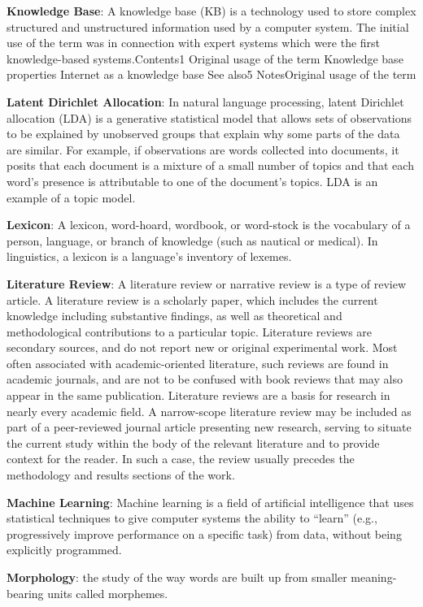 \documentclass[b5paper,]{book}
\theoremstyle{definition}
\theoremstyle{definition}
\theoremstyle{definition}
\theoremstyle{remark}
\begin{document}
\textbf{Knowledge Base}: A knowledge base (KB) is a technology used to
store complex structured and unstructured information used by a computer
system. The initial use of the term was in connection with expert
systems which were the first knowledge-based systems.Contents1 Original
usage of the term Knowledge base properties Internet as a knowledge base
See also5 NotesOriginal usage of the term

\textbf{Latent Dirichlet Allocation}: In natural language processing,
latent Dirichlet allocation (LDA) is a generative statistical model that
allows sets of observations to be explained by unobserved groups that
explain why some parts of the data are similar. For example, if
observations are words collected into documents, it posits that each
document is a mixture of a small number of topics and that each word's
presence is attributable to one of the document's topics. LDA is an
example of a topic model.

\textbf{Lexicon}: A lexicon, word-hoard, wordbook, or word-stock is the
vocabulary of a person, language, or branch of knowledge (such as
nautical or medical). In linguistics, a lexicon is a language's
inventory of lexemes.

\textbf{Literature Review}: A literature review or narrative review is a
type of review article. A literature review is a scholarly paper, which
includes the current knowledge including substantive findings, as well
as theoretical and methodological contributions to a particular topic.
Literature reviews are secondary sources, and do not report new or
original experimental work. Most often associated with academic-oriented
literature, such reviews are found in academic journals, and are not to
be confused with book reviews that may also appear in the same
publication. Literature reviews are a basis for research in nearly every
academic field. A narrow-scope literature review may be included as part
of a peer-reviewed journal article presenting new research, serving to
situate the current study within the body of the relevant literature and
to provide context for the reader. In such a case, the review usually
precedes the methodology and results sections of the work.

\textbf{Machine Learning}: Machine learning is a field of artificial
intelligence that uses statistical techniques to give computer systems
the ability to ``learn'' (e.g., progressively improve performance on a
specific task) from data, without being explicitly programmed.

\textbf{Morphology}: the study of the way words are built up from
smaller meaning-bearing units called morphemes.
\end{document}
